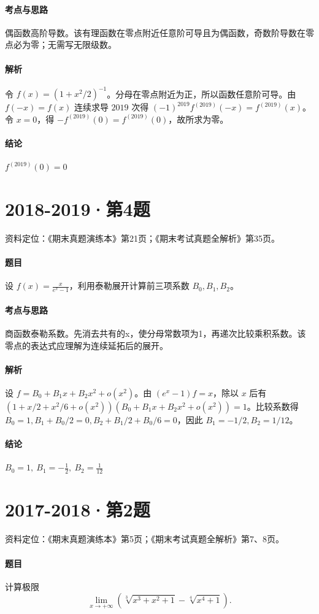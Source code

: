 \documentclass[UTF8,fontset=fandol,12pt,oneside,openany]{ctexrep}
\theoremstyle{definition}
\begin{document}
\paragraph{考点与思路}
偶函数高阶导数。该有理函数在零点附近任意阶可导且为偶函数，奇数阶导数在零点必为零；无需写无限级数。
\paragraph{解析}
令 $f(x)=(1+x^2/2)^{-1}$。分母在零点附近为正，所以函数任意阶可导。由 $f(-x)=f(x)$ 连续求导 $2019$ 次得 $(-1)^{2019}f^{(2019)}(-x)=f^{(2019)}(x)$。令 $x=0$，得 $-f^{(2019)}(0)=f^{(2019)}(0)$，故所求为零。
\paragraph{结论}
$f^{(2019)}(0)=0$

\par\addvspace{18pt}\noindent\begin{minipage}{\linewidth}
\section{2018-2019·第4题}
\label{exam:08:q16}
资料定位：《期末真题演练本》第21页；《期末考试真题全解析》第35页。
\paragraph{题目}
设 $f(x)=\frac{x}{e^x-1}$，利用泰勒展开计算前三项系数 $B_0,B_1,B_2$。
\end{minipage}\par
\paragraph{考点与思路}
商函数泰勒系数。先消去共有的x，使分母常数项为1，再递次比较乘积系数。该零点的表达式应理解为连续延拓后的展开。
\paragraph{解析}
设 $f=B_0+B_1x+B_2x^2+o(x^2)$。由 $(e^x-1)f=x$，除以 $x$ 后有 $(1+x/2+x^2/6+o(x^2))(B_0+B_1x+B_2x^2+o(x^2))=1$。比较系数得 $B_0=1,B_1+B_0/2=0,B_2+B_1/2+B_0/6=0$，因此 $B_1=-1/2,B_2=1/12$。
\paragraph{结论}
$B_0=1,\ B_1=-\frac12,\ B_2=\frac1{12}$

\par\addvspace{18pt}\noindent\begin{minipage}{\linewidth}
\section{2017-2018·第2题}
\label{exam:08:q17}
资料定位：《期末真题演练本》第5页；《期末考试真题全解析》第7、8页。
\paragraph{题目}
计算极限 \[\lim_{x\to+\infty}\left(\sqrt[3]{x^3+x^2+1}-\sqrt[4]{x^4+1}\right).\]
\end{minipage}\par
\end{document}
